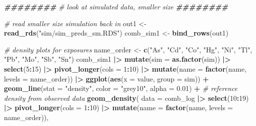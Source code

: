 \documentclass[12pt, twoside]{amherstthesis}
\newenvironment{Shaded}{\begin{snugshade}}{\end{snugshade}}
\newcommand{\AttributeTok}[1]{\textcolor[rgb]{0.13,0.29,0.53}{#1}}
\newcommand{\CommentTok}[1]{\textcolor[rgb]{0.56,0.35,0.01}{\textit{#1}}}
\newcommand{\DecValTok}[1]{\textcolor[rgb]{0.00,0.00,0.81}{#1}}
\newcommand{\DocumentationTok}[1]{\textcolor[rgb]{0.56,0.35,0.01}{\textbf{\textit{#1}}}}
\newcommand{\FloatTok}[1]{\textcolor[rgb]{0.00,0.00,0.81}{#1}}
\newcommand{\FunctionTok}[1]{\textcolor[rgb]{0.13,0.29,0.53}{\textbf{#1}}}
\newcommand{\NormalTok}[1]{#1}
\newcommand{\OtherTok}[1]{\textcolor[rgb]{0.56,0.35,0.01}{#1}}
\newcommand{\SpecialCharTok}[1]{\textcolor[rgb]{0.81,0.36,0.00}{\textbf{#1}}}
\newcommand{\StringTok}[1]{\textcolor[rgb]{0.31,0.60,0.02}{#1}}
\begin{document}
\scriptsize
\begin{Shaded}
\begin{Highlighting}[]
\DocumentationTok{\#\#\#\#\#\#\#\#}
\CommentTok{\# look at simulated data, smaller size}
\DocumentationTok{\#\#\#\#\#\#\#\#}

\CommentTok{\# read smaller size simulation back in}
\NormalTok{out1 }\OtherTok{\textless{}{-}} \FunctionTok{read\_rds}\NormalTok{(}\StringTok{"sim/sim\_preds\_sm.RDS"}\NormalTok{)}
\NormalTok{comb\_sim1 }\OtherTok{\textless{}{-}} \FunctionTok{bind\_rows}\NormalTok{(out1)}

\CommentTok{\# density plots for exposures}
\NormalTok{name\_order }\OtherTok{\textless{}{-}} \FunctionTok{c}\NormalTok{(}\StringTok{"As"}\NormalTok{, }\StringTok{"Cd"}\NormalTok{, }\StringTok{"Co"}\NormalTok{, }\StringTok{"Hg"}\NormalTok{, }\StringTok{"Ni"}\NormalTok{, }\StringTok{"Tl"}\NormalTok{, }\StringTok{"Pb"}\NormalTok{, }\StringTok{"Mo"}\NormalTok{, }\StringTok{"Sb"}\NormalTok{, }\StringTok{"Sn"}\NormalTok{)}
\NormalTok{comb\_sim1 }\SpecialCharTok{|\textgreater{}} 
  \FunctionTok{mutate}\NormalTok{(}\AttributeTok{sim =} \FunctionTok{as.factor}\NormalTok{(sim)) }\SpecialCharTok{|\textgreater{}} 
  \FunctionTok{select}\NormalTok{(}\DecValTok{5}\SpecialCharTok{:}\DecValTok{15}\NormalTok{) }\SpecialCharTok{|\textgreater{}} 
  \FunctionTok{pivot\_longer}\NormalTok{(}\AttributeTok{cols =} \DecValTok{1}\SpecialCharTok{:}\DecValTok{10}\NormalTok{) }\SpecialCharTok{|\textgreater{}}
  \FunctionTok{mutate}\NormalTok{(}\AttributeTok{name =} \FunctionTok{factor}\NormalTok{(name, }\AttributeTok{levels =}\NormalTok{ name\_order)) }\SpecialCharTok{|\textgreater{}} 
  \FunctionTok{ggplot}\NormalTok{(}\FunctionTok{aes}\NormalTok{(}\AttributeTok{x =}\NormalTok{ value, }\AttributeTok{group =}\NormalTok{ sim)) }\SpecialCharTok{+}
  \FunctionTok{geom\_line}\NormalTok{(}\AttributeTok{stat =} \StringTok{"density"}\NormalTok{, }\AttributeTok{color =} \StringTok{"grey10"}\NormalTok{, }\AttributeTok{alpha =} \FloatTok{0.01}\NormalTok{) }\SpecialCharTok{+} 
  \CommentTok{\# reference density from observed data}
  \FunctionTok{geom\_density}\NormalTok{(}
    \AttributeTok{data =}\NormalTok{ comb\_log }\SpecialCharTok{|\textgreater{}} \FunctionTok{select}\NormalTok{(}\DecValTok{10}\SpecialCharTok{:}\DecValTok{19}\NormalTok{) }\SpecialCharTok{|\textgreater{}} \FunctionTok{pivot\_longer}\NormalTok{(}\AttributeTok{cols =} \DecValTok{1}\SpecialCharTok{:}\DecValTok{10}\NormalTok{) }\SpecialCharTok{|\textgreater{}} 
      \FunctionTok{mutate}\NormalTok{(}\AttributeTok{name =} \FunctionTok{factor}\NormalTok{(name, }\AttributeTok{levels =}\NormalTok{ name\_order)),}

\end{Highlighting}
\end{Shaded}
\end{document}
